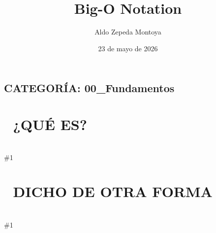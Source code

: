 \documentclass{article}
\newcommand{\quees}[1]{
    \section*{🤔 ¿QUÉ ES?}
    \hrulefill \\
    \#1
}
\newcommand{\dichodeotraforma}[1]{
    \section*{💬 DICHO DE OTRA FORMA}
    \hrulefill \\
    \#1
}
\begin{document}
\title{Big-O Notation}
\author{Aldo Zepeda Montoya}
\date{23 de mayo de 2026}
\maketitle

\subsection*{CATEGORÍA: 00\_Fundamentos}

\quees{
Imagínate que tienes una caja de chocolates 🍫 y quieres
encontrar uno de sabor fresa. ¿Cuánto tiempo tardarías?

\begin{itemize}
    \item \textbf{Caso 1:} Si sabes que el de fresa SIEMPRE está en la posición 1
          \$\rightarrow\$ Lo agarras directo. No importa si hay 10 o 1,000,000 chocolates.
          \$\rightarrow\$ Siempre es 1 paso. ¡Rápidísimo! ⚡

    \item \textbf{Caso 2:} Si los chocolates están desordenados y tienes que revisar
          uno por uno hasta encontrar el de fresa
          \$\rightarrow\$ Si hay 10 chocolates, revisas hasta 10.
          \$\rightarrow\$ Si hay 1,000,000 chocolates, revisas hasta 1,000,000.
          \$\rightarrow\$ El tiempo crece igual que la cantidad de chocolates. 📈

    \item \textbf{Caso 3:} Si por cada chocolate que revisas, tienes que revisar
          TODOS los demás para compararlos
          \$\rightarrow\$ Si hay 10 chocolates \$\rightarrow\$ 10 \$\times\$ 10 = 100 comparaciones
          \$\rightarrow\$ Si hay 100 chocolates \$\rightarrow\$ 100 \$\times\$ 100 = 10,000 comparaciones
          \$\rightarrow\$ ¡Crece muy rápido y se pone muy lento muy pronto! 🐌
\end{itemize}

Big-O Notation es la forma que tienen los programadores para
describir qué tan rápido o lento crece el tiempo que tarda
un algoritmo cuando le das más y más datos.

La "n" siempre representa la cantidad de datos de entrada.
Big-O siempre describe el PEOR caso posible (lo más lento que puede ser).
}

\dichodeotraforma{
Big-O es la métrica estándar para comparar la eficiencia de
algoritmos independientemente del hardware. Describe cómo
escala el tiempo de ejecución (o uso de memoria) en función
del tamaño del input "n", siempre en el worst case.

En interviews, SIEMPRE tienes que dar el Big-O de tu solución.
Es tan esperado como que el código funcione.
}
\end{document}
